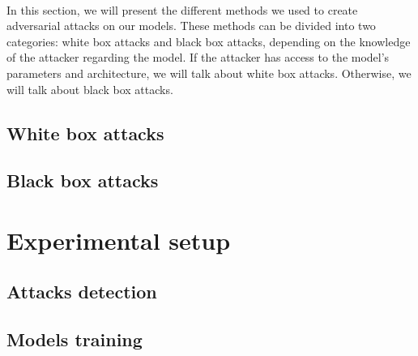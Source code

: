 \documentclass[11pt,twocolumn,letterpaper]{article}
\begin{document}
\paragraph{} In this section, we will present the different methods we used to create adversarial attacks on our models. These methods can be divided into two categories: white box attacks and black box attacks, depending on the knowledge of the attacker regarding the model. If the attacker has access to the model's parameters and architecture, we will talk about white box attacks. Otherwise, we will talk about black box attacks. 

\subsection{White box attacks}

\paragraph{} 

\subsection{Black box attacks}

\paragraph{} 


\section{Experimental setup}
\label{sec:setup}

\subsection{Attacks detection}

\paragraph{} 

\subsection{Models training}

\paragraph{} 
\end{document}
